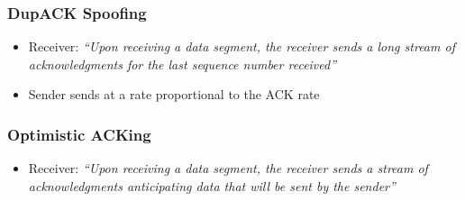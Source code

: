 \subsubsection{DupACK Spoofing}
\begin{itemize}[nosep]
    \item Receiver: \textit{``Upon receiving a data segment, the receiver sends a long stream of acknowledgments for the last sequence number received''}
    \item Sender sends at a rate proportional to the ACK rate
\end{itemize}
\subsubsection{Optimistic ACKing}
\begin{itemize}[nosep]
    \item Receiver: \textit{``Upon receiving a data segment, the receiver sends a stream of acknowledgments anticipating data that will be sent by the sender''}
\end{itemize}
